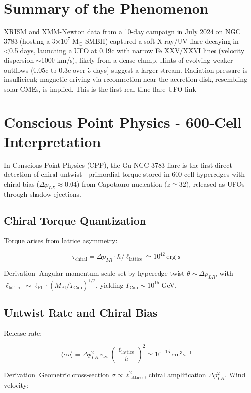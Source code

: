 \documentclass[11pt]{article}
\begin{document}
\section{Summary of the Phenomenon}
XRISM and XMM-Newton data from a 10-day campaign in July 2024 on NGC 3783 (hosting a 3$\times 10^7$ M$_\odot$ SMBH) captured a soft X-ray/UV flare decaying in <0.5 days, launching a UFO at 0.19c with narrow Fe XXV/XXVI lines (velocity dispersion $\sim$1000 km/s), likely from a dense clump. Hints of evolving weaker outflows (0.05c to 0.3c over 3 days) suggest a larger stream. Radiation pressure is insufficient; magnetic driving via reconnection near the accretion disk, resembling solar CMEs, is implied. This is the first real-time flare-UFO link.

\section{Conscious Point Physics - 600-Cell Interpretation}
In Conscious Point Physics (CPP), the Gu NGC 3783 flare is the first direct detection of chiral untwist—primordial torque stored in 600-cell hyperedges with chiral bias ($\Delta p_{LR} \approx 0.04$) from Capotauro nucleation ($z \simeq 32$), released as UFOs through shadow ejections.

\subsection{Chiral Torque Quantization}
Torque arises from lattice asymmetry:

\[
\tau_{\text{chiral}} = \Delta p_{LR} \cdot \hbar / \ell_{\text{lattice}} \simeq 10^{42} \, \text{erg s}
\]

Derivation: Angular momentum scale set by hyperedge twist $\theta \sim \Delta p_{LR}$, with $\ell_{\text{lattice}} \sim \ell_{\text{Pl}} \cdot (M_{\text{Pl}} / T_{\text{Cap}})^{1/2}$, yielding $T_{\text{Cap}} \sim 10^{15}$ GeV.

\subsection{Untwist Rate and Chiral Bias}
Release rate:

\[
\langle \sigma v \rangle = \Delta p_{LR}^2 \, v_{\text{rel}} \, \left( \frac{\ell_{\text{lattice}}}{\hbar} \right)^2 \simeq 10^{-15} \, \text{cm}^3 \text{s}^{-1}
\]

Derivation: Geometric cross-section $\sigma \propto \ell_{\text{lattice}}^2$, chiral amplification $\Delta p_{LR}^2$. Wind velocity:
\end{document}
